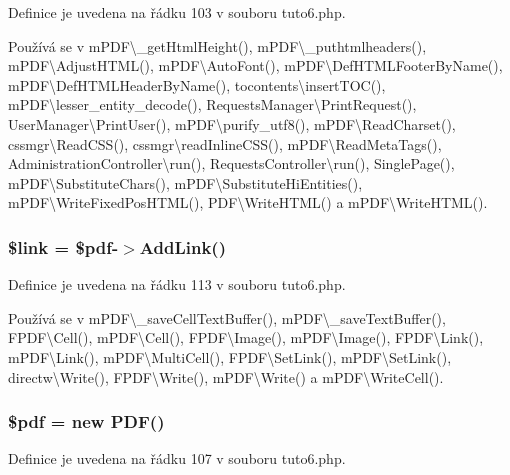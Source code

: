 Definice je uvedena na řádku 103 v souboru tuto6.\-php.



Používá se v m\-P\-D\-F\textbackslash{}\-\_\-get\-Html\-Height(), m\-P\-D\-F\textbackslash{}\-\_\-puthtmlheaders(), m\-P\-D\-F\textbackslash{}\-Adjust\-H\-T\-M\-L(), m\-P\-D\-F\textbackslash{}\-Auto\-Font(), m\-P\-D\-F\textbackslash{}\-Def\-H\-T\-M\-L\-Footer\-By\-Name(), m\-P\-D\-F\textbackslash{}\-Def\-H\-T\-M\-L\-Header\-By\-Name(), tocontents\textbackslash{}insert\-T\-O\-C(), m\-P\-D\-F\textbackslash{}lesser\-\_\-entity\-\_\-decode(), Requests\-Manager\textbackslash{}\-Print\-Request(), User\-Manager\textbackslash{}\-Print\-User(), m\-P\-D\-F\textbackslash{}purify\-\_\-utf8(), m\-P\-D\-F\textbackslash{}\-Read\-Charset(), cssmgr\textbackslash{}\-Read\-C\-S\-S(), cssmgr\textbackslash{}read\-Inline\-C\-S\-S(), m\-P\-D\-F\textbackslash{}\-Read\-Meta\-Tags(), Administration\-Controller\textbackslash{}run(), Requests\-Controller\textbackslash{}run(), Single\-Page(), m\-P\-D\-F\textbackslash{}\-Substitute\-Chars(), m\-P\-D\-F\textbackslash{}\-Substitute\-Hi\-Entities(), m\-P\-D\-F\textbackslash{}\-Write\-Fixed\-Pos\-H\-T\-M\-L(), P\-D\-F\textbackslash{}\-Write\-H\-T\-M\-L() a m\-P\-D\-F\textbackslash{}\-Write\-H\-T\-M\-L().

\hypertarget{tuto6_8php_a5d346e31b75d916e3bac9cb193bfc97f}{
\subsubsection[{\$link}]{\setlength{\rightskip}{0pt plus 5cm}\$link = \$pdf-\/$>$Add\-Link()}}\label{tuto6_8php_a5d346e31b75d916e3bac9cb193bfc97f}


Definice je uvedena na řádku 113 v souboru tuto6.\-php.



Používá se v m\-P\-D\-F\textbackslash{}\-\_\-save\-Cell\-Text\-Buffer(), m\-P\-D\-F\textbackslash{}\-\_\-save\-Text\-Buffer(), F\-P\-D\-F\textbackslash{}\-Cell(), m\-P\-D\-F\textbackslash{}\-Cell(), F\-P\-D\-F\textbackslash{}\-Image(), m\-P\-D\-F\textbackslash{}\-Image(), F\-P\-D\-F\textbackslash{}\-Link(), m\-P\-D\-F\textbackslash{}\-Link(), m\-P\-D\-F\textbackslash{}\-Multi\-Cell(), F\-P\-D\-F\textbackslash{}\-Set\-Link(), m\-P\-D\-F\textbackslash{}\-Set\-Link(), directw\textbackslash{}\-Write(), F\-P\-D\-F\textbackslash{}\-Write(), m\-P\-D\-F\textbackslash{}\-Write() a m\-P\-D\-F\textbackslash{}\-Write\-Cell().

\hypertarget{tuto6_8php_a964ee5ee597c515cbb4dad2f14054cb4}{
\subsubsection[{\$pdf}]{\setlength{\rightskip}{0pt plus 5cm}\$pdf = new {\bf P\-D\-F}()}}\label{tuto6_8php_a964ee5ee597c515cbb4dad2f14054cb4}


Definice je uvedena na řádku 107 v souboru tuto6.\-php.

